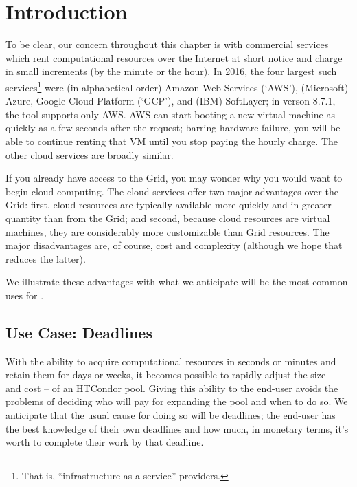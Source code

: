 \section{\label{sec:clouds-introduction}Introduction}

To be clear, our concern throughout this chapter is with commercial services
which rent computational resources over the Internet at short notice and
charge in small increments (by the minute or the hour).  In 2016, the four
largest such services\footnote{That is, ``infrastructure-as-a-service''
providers.} were (in alphabetical order) Amazon Web Services (`AWS'),
(Microsoft) Azure, Google Cloud Platform (`GCP'), and (IBM) SoftLayer; in
verson 8.7.1, the  tool supports only AWS.  AWS can start
booting a new virtual machine as quickly as a few seconds after the request;
barring hardware failure, you will be able to continue renting that VM until
you stop paying the hourly charge.  The other cloud services are broadly
similar.

If you already have access to the Grid, you may wonder why you would want to
begin cloud computing.  The cloud services offer two major advantages over
the Grid: first, cloud resources are typically available more quickly and
in greater quantity than from the Grid; and second, because cloud resources are
virtual machines, they are considerably more customizable than Grid resources.
The major disadvantages are, of course, cost and complexity (although we
hope that  reduces the latter).

We illustrate these advantages with what we anticipate will be the most
common uses for .

\subsection{Use Case: Deadlines}

With the ability to acquire computational resources in seconds or minutes
and retain them for days or weeks, it becomes possible to rapidly adjust
the size -- and cost -- of an HTCondor pool.  Giving this ability to the
end-user avoids the problems of deciding who will pay for expanding the
pool and when to do so.  We anticipate that the usual cause for doing so
will be deadlines; the end-user has the best knowledge of their own
deadlines and how much, in monetary terms, it's worth to complete their
work by that deadline.



